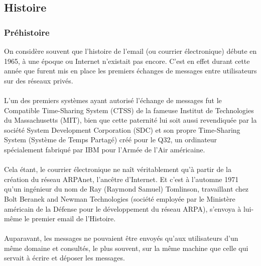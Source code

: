 \documentclass[french]{report}
\begin{document}
\subsection{\huge Histoire}
\subsubsection{\LARGE Préhistoire}
\LARGE On considère souvent que l’histoire de l’email (ou courrier électronique) débute en 1965, à une époque ou Internet n’existait pas encore. C’est en effet durant cette année que furent mis en place les premiers échanges de messages entre utilisateurs sur des réseaux privés.\\ \\
L’un des premiers systèmes ayant autorisé l’échange de messages fut le Compatible Time-Sharing System (CTSS) de la fameuse Institut de Technologies du Massachusetts (MIT), bien que cette paternité lui soit aussi revendiquée par la société System Development Corporation (SDC) et son propre Time-Sharing System (Système de Temps Partagé) créé pour le Q32, un ordinateur spécialement fabriqué par IBM pour l’Armée de l’Air américaine.\\ \\
Cela étant, le courrier électronique ne naît véritablement qu’à partir de la création du réseau ARPAnet, l’ancêtre d’Internet. Et c’est à l’automne 1971 qu’un ingénieur du nom de Ray (Raymond Samuel) Tomlinson, travaillant chez Bolt Beranek and Newman Technologies (société employée par le Ministère américain de la Défense pour le développement du réseau ARPA), s’envoya à lui-même le premier email de l’Histoire.\\ \\
Auparavant, les messages ne pouvaient être envoyés qu’aux utilisateurs d’un même domaine et consultés, le plus souvent, sur la même machine que celle qui servait à écrire et déposer les messages.
\end{document}
